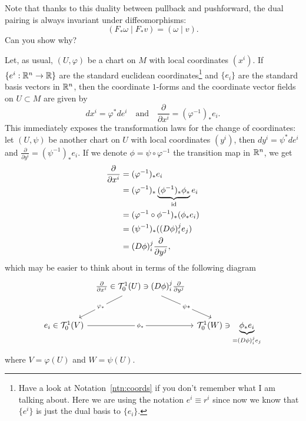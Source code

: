 Note that thanks to this duality between pullback and pushforward, the dual pairing is always invariant under diffeomorphisms:
\begin{equation}\label{eq:pairdualitypull}
  (F_* \omega \mid F_* v) = (\omega \mid v).
\end{equation}
Can you show why?

\begin{example}
  Let, as usual, $(U,\varphi)$ be a chart on $M$ with local coordinates $(x^i)$.
  If $\{e^i:\mathbb{R}^n\to\mathbb{R}\}$ are the standard euclidean coordinates\footnote{Have a look at Notation~\ref{ntn:coords} if you don't remember what I am talking about.
  Here we are using the notation $e^i \equiv r^i$ since now we know that $\{e^i\}$ is just the dual basis to $\{e_i\}$. } and $\{e_i\}$ are the standard basis vectors in $\mathbb{R}^n$, then the coordinate $1$-forms and the coordinate vector fields on $U\subset M$ are given by
  \begin{equation}
    dx^i = \varphi^* de^i
    \quad\mbox{and}\quad
    \frac{\partial}{\partial x^i} = (\varphi^{-1})_* e_i.
  \end{equation}
  This immediately exposes the transformation laws for the change of coordinates: let $(U, \psi)$ be another chart on $U$ with local coordinates $(y^i)$, then $dy^i = \psi^* de^i$ and $\frac{\partial}{\partial y^i} = (\psi^{-1})_* e_i$. If we denote $\phi = \psi\circ\varphi^{-1}$ the transition map in $\mathbb{R}^n$, we get
  \begin{align}
    \frac{\partial}{\partial x^i} &= (\varphi^{-1})_* e_i \\
    &= (\varphi^{-1})_* \LaTeXunderbrace{(\phi^{-1})_*\phi_*}_{\id} e_i \\
    &= (\varphi^{-1}\circ \phi^{-1})_* (\phi_* e_i) \\
    &= (\psi^{-1})_* ((D\phi)_i^j e_j) \\
    &= (D\phi)_i^j \frac{\partial}{\partial y^j},
  \end{align}
  which may be easier to think about in terms of the following diagram
  \begin{equation}\nonumber
    \begin{tikzcd}[row sep=large, column sep=tiny]
      & \frac{\partial}{\partial x^i} \in \cT_0^1(U) \ni (D\phi)_i^j \frac{\partial}{\partial y^j} \arrow[dl, "\varphi_*" description] \arrow[dr, "\psi*" description] & \\
      e_i \in \cT_0^1(V) \arrow[rr, "\phi_*" description] & & \cT_0^1(W) \ni \LaTeXunderbrace{\phi_* e_i}_{= (D\phi)_i^j e_j}
    \end{tikzcd}
  \end{equation}
  where $V = \varphi(U)$ and $W = \psi(U)$.


\end{example}
